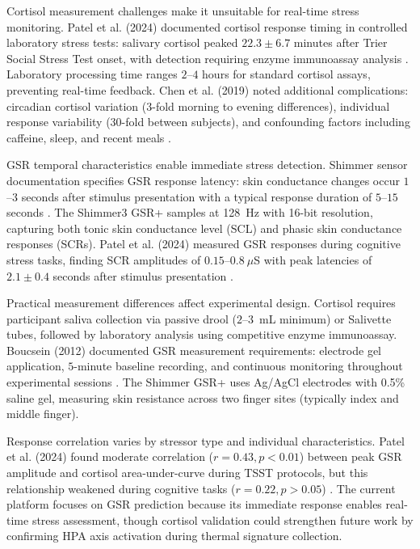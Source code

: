 \documentclass{report}
\begin{document}
    Cortisol measurement challenges make it unsuitable for real-time stress monitoring. Patel et al. (2024) documented cortisol response timing in controlled laboratory stress tests: salivary cortisol peaked $22.3 \pm 6.7$ minutes after Trier Social Stress Test onset, with detection requiring enzyme immunoassay analysis \cite{patel2024}. Laboratory processing time ranges $2$--$4$ hours for standard cortisol assays, preventing real-time feedback. Chen et al. (2019) noted additional complications: circadian cortisol variation ($3$-fold morning to evening differences), individual response variability ($30$-fold between subjects), and confounding factors including caffeine, sleep, and recent meals \cite{chen2019}.

    GSR temporal characteristics enable immediate stress detection. Shimmer sensor documentation specifies GSR response latency: skin conductance changes occur $1$--$3$ seconds after stimulus presentation with a typical response duration of $5$--$15$ seconds \cite{shimmerdoc8}. The Shimmer3 GSR+ samples at 128~Hz with 16-bit resolution, capturing both tonic skin conductance level (SCL) and phasic skin conductance responses (SCRs). Patel et al. (2024) measured GSR responses during cognitive stress tasks, finding SCR amplitudes of $0.15$--$0.8~\mu$S with peak latencies of $2.1 \pm 0.4$ seconds after stimulus presentation \cite{patel2024}.

    Practical measurement differences affect experimental design. Cortisol requires participant saliva collection via passive drool ($2$--$3$~mL minimum) or Salivette tubes, followed by laboratory analysis using competitive enzyme immunoassay. Boucsein (2012) documented GSR measurement requirements: electrode gel application, $5$-minute baseline recording, and continuous monitoring throughout experimental sessions \cite{boucsein2012}. The Shimmer GSR+ uses Ag/AgCl electrodes with 0.5\% saline gel, measuring skin resistance across two finger sites (typically index and middle finger).

    Response correlation varies by stressor type and individual characteristics. Patel et al. (2024) found moderate correlation ($r = 0.43, p < 0.01$) between peak GSR amplitude and cortisol area-under-curve during TSST protocols, but this relationship weakened during cognitive tasks ($r = 0.22, p > 0.05$) \cite{patel2024}. The current platform focuses on GSR prediction because its immediate response enables real-time stress assessment, though cortisol validation could strengthen future work by confirming HPA axis activation during thermal signature collection.
\end{document}
